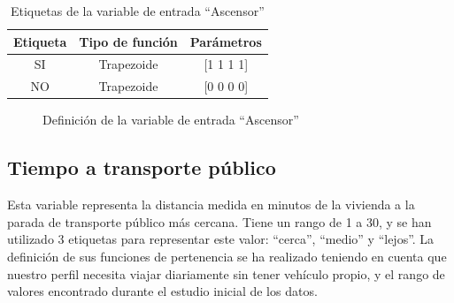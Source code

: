 \documentclass[12pt]{report} %
\begin{document}
        \begin{table}[h]
            \center
            \begin{tabular}{@{}ccc@{}}
                \toprule
                \textbf{Etiqueta} & \textbf{Tipo de función} & \textbf{Parámetros} \\
                \midrule
                SI & Trapezoide & [1 1 1 1] \\
                NO & Trapezoide & [0 0 0 0] \\
                \bottomrule
            \end{tabular}
            \caption{Etiquetas de la variable de entrada ``Ascensor''}
        \end{table}

        \begin{figure}[H]
            \centering
            \caption{Definición de la variable de entrada ``Ascensor''}
        \end{figure}

        \subsection{Tiempo a transporte público}
        Esta variable representa la distancia medida en minutos de la vivienda a la parada de transporte público más cercana.
        Tiene un rango de 1 a 30, y se han utilizado 3 etiquetas para representar este valor: ``cerca'', ``medio'' y ``lejos''.
        La definición de sus funciones de pertenencia se ha realizado teniendo en cuenta que nuestro perfil necesita viajar diariamente sin tener vehículo propio, y el rango de valores encontrado durante el estudio inicial de los datos.
\end{document}
